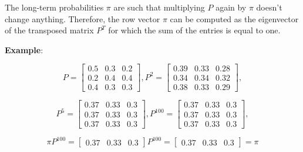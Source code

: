 \begin{paracol}{2}
The long-term probabilities $\pi$ are such that multiplying $P$ again by $\pi$ doesn't change anything. Therefore, the row vector $\pi$ can be computed as the eigenvector of the transposed matrix $P^T$ for which the sum of the entries is equal to one.

\textbf{Example}:

\vspace{-5pt}

$$
P = \begin{bmatrix}
    0.5 & 0.3 & 0.2 \\
    0.2 & 0.4 & 0.4 \\
    0.4 & 0.3 & 0.3
\end{bmatrix}, P^2 = \begin{bmatrix}
    0.39 & 0.33 & 0.28 \\
    0.34 & 0.34 & 0.32 \\
    0.38 & 0.33 & 0.29
\end{bmatrix},
$$

\vspace{-5pt}

$$
P^5 = \begin{bmatrix}
    0.37 & 0.33 & 0.3 \\
    0.37 & 0.33 & 0.3 \\
    0.37 & 0.33 & 0.3
\end{bmatrix}, P^{100} = \begin{bmatrix}
    0.37 & 0.33 & 0.3 \\
    0.37 & 0.33 & 0.3 \\
    0.37 & 0.33 & 0.3
\end{bmatrix},
$$

\vspace{-5pt}

$$
\pi P^{100} = \begin{bmatrix}
    0.37 & 0.33 & 0.3
\end{bmatrix} P^{100} = \begin{bmatrix}
    0.37 & 0.33 & 0.3
\end{bmatrix} = \pi
$$

\end{paracol}
